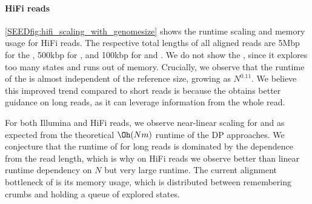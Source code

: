 \paragraph{HiFi reads}
\cref{SEEDfig:hifi_scaling_with_genomesize} shows the runtime scaling and memory
usage for HiFi reads. The respective total lengths of all aligned reads are 5Mbp
for the \sh, 500kbp for \graphaligner, and 100kbp for \vargas and \pasgal. We
do not show the \prefixh, since it explores too many states and runs out of
memory.
%
Crucially, we observe that the runtime of the \sh is almost independent of
the reference size, growing as $N^{0.11}$. We believe this improved trend
compared to short reads is because the \sh obtains better guidance on long
reads, as it can leverage information from the whole read.

For both Illumina and HiFi reads, we observe near-linear scaling for \pasgal and
\graphaligner as expected from the theoretical $\Oh(Nm)$ runtime of the DP
approaches. We conjecture that the runtime of \vargas for long reads is
dominated by the dependence from the read length, which is why on HiFi reads we
observe better than linear runtime dependency on $N$ but very large runtime. The
current alignment bottleneck of \astarixseeds is its memory usage, which is
distributed between remembering crumbs and holding a queue of explored states.